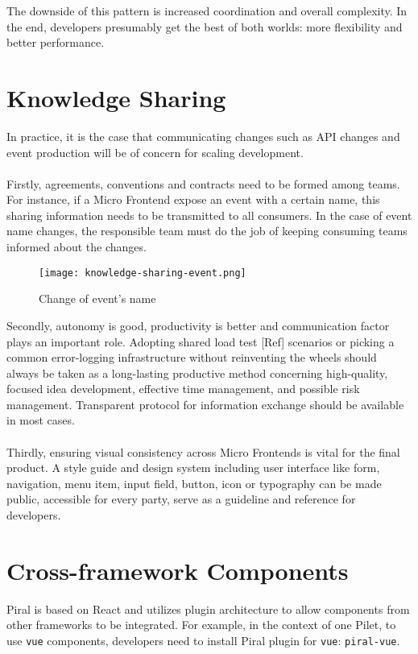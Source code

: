 \documentclass[a4paper]{book}
\begin{document}
The downside of this pattern is increased coordination and overall complexity. In the end, developers presumably get the best of both worlds: more flexibility and better performance. 
\section{Knowledge Sharing }
In practice, it is the case that communicating changes such as API changes and event production will be of concern for scaling development. 
\\ \\
Firstly, agreements, conventions and contracts need to be formed among teams. For instance, if a Micro Frontend expose an event with a certain name, this sharing information needs to be transmitted to all consumers. In the case of event name changes, the responsible team must do the job of keeping consuming teams informed about the changes.
\begin{figure}[h!]
    \centering
    \captionsetup{justification=centering}
    \texttt{[image: knowledge-sharing-event.png]}
    \caption{Change of event's name \cite{Rap20}}
    \label{fig:5}
\end{figure}
Secondly, autonomy is good, productivity is better and communication factor plays an important role. Adopting shared load test [Ref] scenarios or picking a common error-logging infrastructure without reinventing the wheels should always be taken as a long-lasting productive method concerning high-quality, focused idea development, effective time management, and possible risk management. Transparent protocol for information exchange should be available in most cases.
\\ \\
Thirdly, ensuring visual consistency across Micro Frontends is vital for the final product. A style guide and design system including user interface like form, navigation, menu item, input field, button, icon or typography can be made public, accessible for every party, serve as a guideline and reference for developers.

\section{Cross-framework Components}
Piral is based on React and utilizes plugin architecture to allow components from other frameworks to be integrated. For example, in the context of one Pilet, to use \verb|vue| components, developers need to install Piral plugin for \verb|vue|: \verb|piral-vue|.
\end{document}
